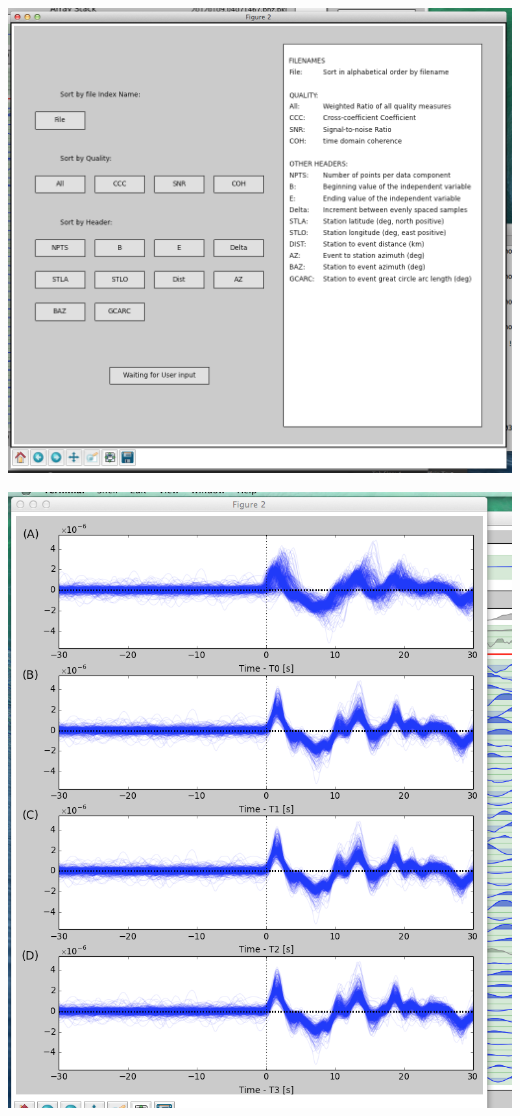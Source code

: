\documentclass[letterpaper,10pt,english]{sphinxmanual}
\begin{document}
\includegraphics{sorting-interface.png}

\includegraphics{SACP2_popup.png}
\end{document}
